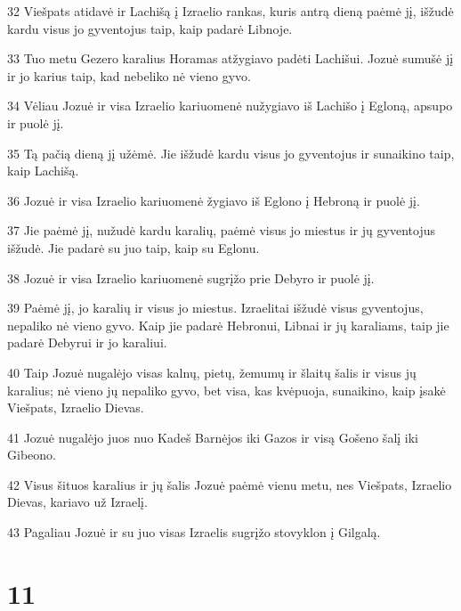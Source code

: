 \par 32 Viešpats atidavė ir Lachišą į Izraelio rankas, kuris antrą dieną paėmė jį, išžudė kardu visus jo gyventojus taip, kaip padarė Libnoje. 
\par 33 Tuo metu Gezero karalius Horamas atžygiavo padėti Lachišui. Jozuė sumušė jį ir jo karius taip, kad nebeliko nė vieno gyvo. 
\par 34 Vėliau Jozuė ir visa Izraelio kariuomenė nužygiavo iš Lachišo į Egloną, apsupo ir puolė jį. 
\par 35 Tą pačią dieną jį užėmė. Jie išžudė kardu visus jo gyventojus ir sunaikino taip, kaip Lachišą. 
\par 36 Jozuė ir visa Izraelio kariuomenė žygiavo iš Eglono į Hebroną ir puolė jį. 
\par 37 Jie paėmė jį, nužudė kardu karalių, paėmė visus jo miestus ir jų gyventojus išžudė. Jie padarė su juo taip, kaip su Eglonu. 
\par 38 Jozuė ir visa Izraelio kariuomenė sugrįžo prie Debyro ir puolė jį. 
\par 39 Paėmė jį, jo karalių ir visus jo miestus. Izraelitai išžudė visus gyventojus, nepaliko nė vieno gyvo. Kaip jie padarė Hebronui, Libnai ir jų karaliams, taip jie padarė Debyrui ir jo karaliui. 
\par 40 Taip Jozuė nugalėjo visas kalnų, pietų, žemumų ir šlaitų šalis ir visus jų karalius; nė vieno jų nepaliko gyvo, bet visa, kas kvėpuoja, sunaikino, kaip įsakė Viešpats, Izraelio Dievas. 
\par 41 Jozuė nugalėjo juos nuo Kadeš Barnėjos iki Gazos ir visą Gošeno šalį iki Gibeono. 
\par 42 Visus šituos karalius ir jų šalis Jozuė paėmė vienu metu, nes Viešpats, Izraelio Dievas, kariavo už Izraelį. 
\par 43 Pagaliau Jozuė ir su juo visas Izraelis sugrįžo stovyklon į Gilgalą.



\chapter{11}


